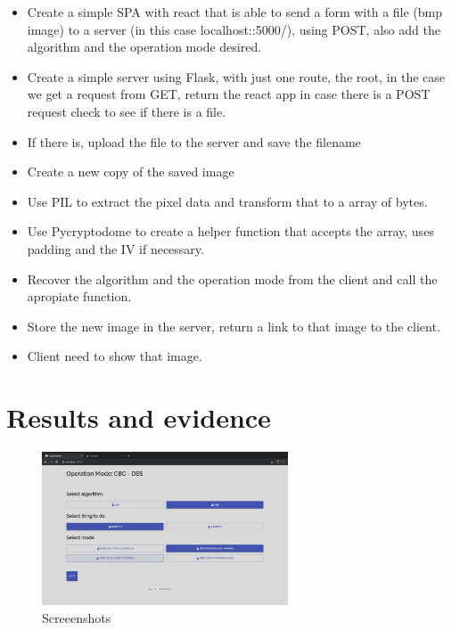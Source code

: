 \documentclass[fleqn, journal, onecolumn]{IEEEtran}             %
\theoremstyle{break}                                            %
\begin{document}
    \begin{itemize}
      \item Create a simple SPA with react that is able to send a form with a file (bmp image) to a server (in this case localhost::5000/), 
      using POST, also add the algorithm and the operation mode desired.

      \item Create a simple server using Flask, with just one route, the root, in the case we get a request from GET, return the react app
      in case there is a POST request check to see if there is a file.

      \item If there is, upload the file to the server and save the filename
      \item Create a new copy of the saved image
      \item Use PIL to extract the pixel data and transform that to a array of bytes.
      \item Use Pycryptodome to create a helper function that accepts the array, uses padding and the IV if necessary.
      \item Recover the algorithm and the operation mode from the client and call the apropiate function.
      \item Store the new image in the server, return a link to that image to the client.
      \item Client need to show that image.
      
    \end{itemize}
  

  \section{Results and evidence}

    \begin{figure}[h]
      \includegraphics[width=0.65\textwidth]{data1}
      \caption{Screeenshots}
    \end{figure}
\end{document}
